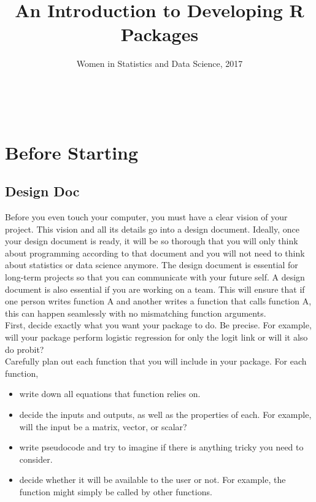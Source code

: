 \documentclass{article}
\title{An Introduction to Developing R Packages}
\author{Women in Statistics and Data Science, 2017}
\begin{document}
\maketitle{}

\\






\section{Before Starting}
\subsection{Design Doc}
Before you even touch your computer, you must  have a clear vision of your project. This vision and all its details go into a design document. Ideally, once your design document is ready, it will be so thorough that you will only think about programming according to that document and you will not need to think about statistics or data science anymore. The design document is essential for long-term projects so that you can communicate with your future self. A design document is also essential if you are working on a team. This will ensure that if one person writes  function A and another  writes a function that calls function A,  this can happen seamlessly with no mismatching function arguments.\\

First, decide exactly what you want your package to do. Be precise. For example, will your package perform logistic regression for only the logit link or will it also do probit?\\





Carefully plan out each function that you will include in your package. For each function,
\begin{itemize}
\item write down all equations that function relies on.
\item decide the inputs and outputs, as well as the properties of each. For example, will the input be a matrix, vector, or scalar?
\item write pseudocode  and try to imagine if there is anything tricky you need to consider. 
\item decide whether it will be available to the user or not. For example, the function might simply be called by other functions. 
\end{itemize}
\end{document}
